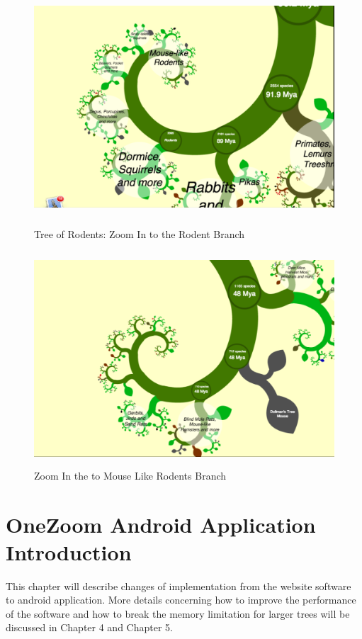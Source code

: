 \documentclass[MSc]{icldt}
\begin{document}
\begin{figure}[H]
  \centering
  \includegraphics [width=15cm,height=8.8cm]{Rodent}
  \caption{Tree of Rodents: Zoom In to the Rodent Branch}
  \label{fig:rodent}
\end{figure}

\begin{figure}[H]
  \centering
  \includegraphics [width=15cm,height=8cm]{MouseLikeRodent}
  \caption{Zoom In the to Mouse Like Rodents Branch}
  \label{fig:mouseLikeRodent}
\end{figure}

\chapter{OneZoom Android Application Introduction}

This chapter will describe changes of implementation from the website software to android application. More details concerning how to improve the performance of the software and how to break the memory limitation for larger trees will be discussed in Chapter 4 and Chapter 5.
\end{document}
